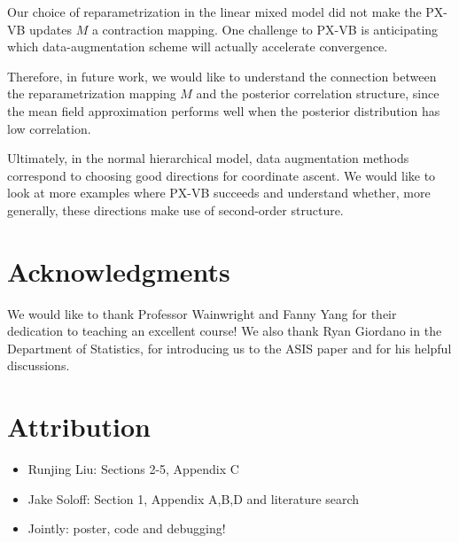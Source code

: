 \documentclass{article}
\begin{document}
Our choice of reparametrization in the linear mixed model did not make the PX-VB updates $M$ a contraction mapping. One challenge to PX-VB is anticipating which data-augmentation scheme will actually accelerate convergence.

Therefore, in future work, we would like to understand the connection between the reparametrization mapping $M$ and the posterior correlation structure, since the mean field approximation performs well when the posterior distribution has low correlation. 

Ultimately, in the normal hierarchical model, data augmentation methods correspond to choosing good directions for coordinate ascent. We would like to look at more examples where PX-VB succeeds and understand whether, more generally, these directions make use of second-order structure.


\newpage

\section*{Acknowledgments}
We would like to thank Professor Wainwright and Fanny Yang for their dedication to teaching an excellent course! We also thank Ryan Giordano in the Department of Statistics, for introducing us to the ASIS paper \cite{Yu} and for his helpful discussions.


\section*{Attribution}
\begin{itemize}
\item Runjing Liu: Sections 2-5, Appendix C
\item Jake Soloff: Section 1, Appendix A,B,D and literature search
\item Jointly: poster, code and debugging!
\end{itemize}
\end{document}
